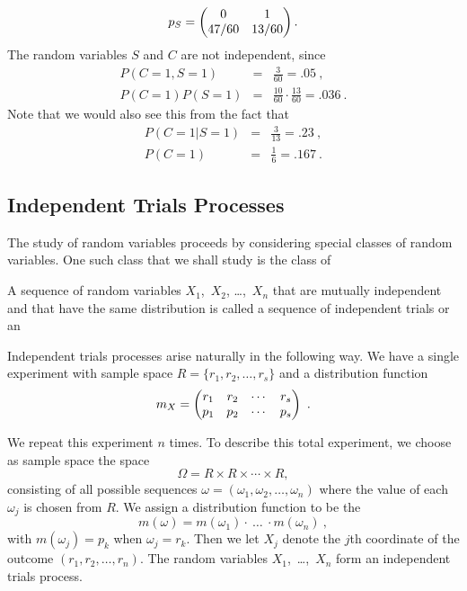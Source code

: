 \begin{example}
$$ p_S = \begin{pmatrix} 0     & 1     \cr 47/60 & 13/60 \cr\end{pmatrix}.
$$
The random variables $S$ and $C$ are not independent, since
\begin{eqnarray*}
 P(C = 1,S = 1)   &=& \frac 3{60} = .05\ , \\
P(C = 1)P(S = 1) &=& \frac {10}{60} \cdot \frac
{13}{60} = .036\ .
\end{eqnarray*}
Note that we would also see this from the fact that
\begin{eqnarray*} P(C = 1|S = 1) &=& \frac 3{13} = .23\ , \\
P(C = 1) &=& \frac 16 = .167\ .
\end{eqnarray*}

\end{example}

\subsection*{Independent Trials Processes}

The study of random variables proceeds by considering special classes of random variables. 
One such class that we shall study is the class of 

\begin{definition}\label{def 5.5} A sequence of random variables $X_1$,~$X_2$, \dots,~$X_n$
that are mutually independent and that have the same distribution is called a sequence of
independent trials or an 

Independent trials processes arise naturally in the following way.  We have a single
experiment with sample space $R = \{r_1,r_2,\dots,r_s\}$ and a distribution function
$$m_X = \begin{pmatrix} r_1 & r_2 & \cdots & r_s \cr p_1 & p_2 & \cdots & p_s\cr\end{pmatrix}\ .
$$

We repeat this experiment $n$ times.  To describe this total experiment, we choose as sample
space the space
$$
\Omega = R \times R \times\cdots\times R,
$$ consisting of all possible sequences $\omega = (\omega_1,\omega_2,\dots,\omega_n)$ where
the value of each $\omega_j$ is chosen from $R$.  We assign a distribution function to be
the 
$$ m(\omega) = m(\omega_1)\cdot\ \ldots\ \cdot m(\omega_n)\ ,
$$ 
with $m(\omega_j) = p_k$ when $\omega_j = r_k$.  Then we let $X_j$ denote the $j$th coordinate
of the outcome $(r_1, r_2, \ldots, r_n)$.  The random variables
$X_1$,~\dots,~$X_n$ form an independent trials process.
\end{definition}

